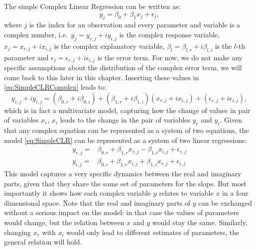 \documentclass[
]{book}
\begin{document}
The simple Complex Linear Regression can be written as:
\begin{equation}
    y_j = \beta_0 + \beta_1 x_j + \epsilon_j,
    \label{eq:SimpleCLRComplex}
\end{equation}
where \(j\) is the index for an observation and every parameter and variable is a complex number, i.e.~\(y_j = y_{r,j}+i y_{i,j}\) is the complex response variable, \(x_j = x_{r,j}+i x_{i,j}\) is the complex explanatory variable, \(\beta_{l} = \beta_{l,r} + i \beta_{l,i}\) is the \(l\)-th parameter and \(\epsilon_j = \epsilon_{r,j} + i \epsilon_{i,j}\) is the error term. For now, we do not make any specific assumptions about the distribution of the complex error term, we will come back to this later in this chapter. Inserting these values in \eqref{eq:SimpleCLRComplex} leads to:
\begin{equation}
    y_{r,j}+i y_{i,j} = (\beta_{0,r} + i \beta_{0,i}) + (\beta_{1,r} + i \beta_{1,i}) (x_{r,j}+i x_{i,j}) + (\epsilon_{r,j} + i \epsilon_{i,j}),
    \label{eq:SimpleCLR}
\end{equation}
which is in fact a multivariate model, capturing how the change of values in pair of variables \(x_r\), \(x_i\) leads to the change in the pair of variables \(y_r\) and \(y_i\). Given that any complex equation can be represented as a system of two equations, the model \eqref{eq:SimpleCLR} can be represented as a system of two linear regressions:
\begin{equation}
    \begin{aligned}
        y_{r,j} = & \beta_{0,r} + \beta_{1,r} x_{r,j} - \beta_{1,i} x_{i,j} + \epsilon_{r,j} \\
        y_{i,j} = & \beta_{0,i} + \beta_{1,r} x_{i,j} + \beta_{1,i} x_{r,j} + \epsilon_{i,j}
    \end{aligned}
    \label{eq:SimpleCLRSystem}
\end{equation}
This model captures a very specific dynamics between the real and imaginary parts, given that they share the same set of parameters for the slope. But most importantly it shows how each complex variable \(y\) relates to variable \(x\) in a four dimensional space. Note that the real and imaginary parts of \(y\) can be exchanged without a serious impact on the model: in that case the values of parameters would change, but the relation between \(x\) and \(y\) would stay the same. Similarly, changing \(x_r\) with \(x_i\) would only lead to different estimates of parameters, the general relation will hold.
\end{document}
